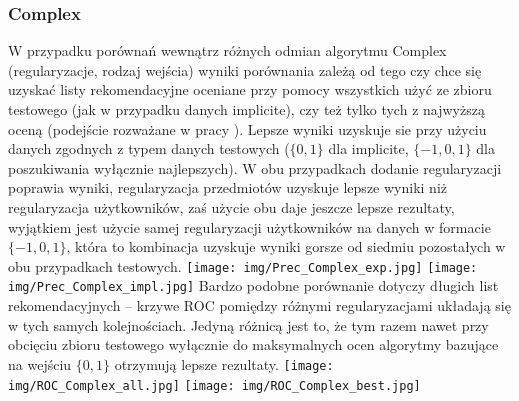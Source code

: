 \documentclass{pracamgr}
\begin{document}
    \subsubsection{Complex}
     W przypadku porównań wewnątrz różnych odmian algorytmu Complex (regularyzacje, rodzaj wejścia)
     wyniki porównania zależą od tego czy chce się uzyskać listy rekomendacyjne oceniane przy pomocy wszystkich
     użyć ze zbioru testowego (jak w przypadku danych implicite), czy też tylko tych z najwyższą oceną (podejście rozważane w pracy \cite{205}).
     Lepsze wyniki uzyskuje sie przy użyciu danych zgodnych z typem danych testowych ($\{0,1\}$ dla implicite,
     $\{-1,0,1\}$ dla poszukiwania wyłącznie najlepszych). W obu przypadkach dodanie regularyzacji poprawia wyniki,
     regularyzacja przedmiotów uzyskuje lepsze wyniki niż regularyzacja użytkowników, zaś użycie obu daje jeszcze lepsze rezultaty,
     wyjątkiem jest użycie samej regularyzacji użytkowników na danych w formacie $\{-1,0,1\}$,
     która to kombinacja uzyskuje wyniki gorsze od siedmiu pozostałych w obu przypadkach testowych.\newline
     \texttt{[image: img/Prec\_Complex\_exp.jpg]}\newline
     \texttt{[image: img/Prec\_Complex\_impl.jpg]}\newline
     Bardzo podobne porównanie dotyczy długich list rekomendacyjnych -- krzywe ROC pomiędzy różnymi regularyzacjami układają się w tych samych kolejnościach.
     Jedyną różnicą jest to, że tym razem nawet przy obcięciu zbioru testowego wyłącznie do maksymalnych ocen algorytmy bazujące na wejściu $\{0,1\}$ otrzymują
     lepsze rezultaty.\newline
     \texttt{[image: img/ROC\_Complex\_all.jpg]}
     \texttt{[image: img/ROC\_Complex\_best.jpg]}\newline
\end{document}
